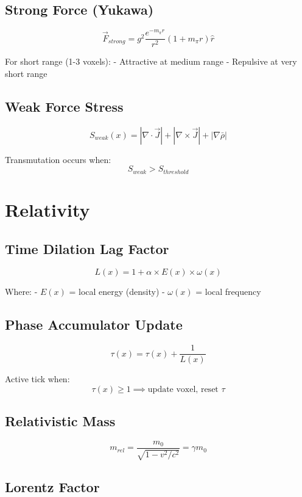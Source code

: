 \documentclass[
  11pt,
  letterpaper,
  twoside,
  openany]{book}
\makeatletter
\let\orig@section\section
\renewcommand{\section}{\needspace{8\baselineskip}\orig@section}
\let\orig@subsection\subsection
\renewcommand{\subsection}{\needspace{6\baselineskip}\orig@subsection}
\makeatother
\begin{document}
\subsection{Strong Force (Yukawa)}\label{strong-force-yukawa}

\[
\vec{F}_{strong} = g^2 \frac{e^{-m_\pi r}}{r^2}(1 + m_\pi r)\hat{r}
\]

For short range (1-3 voxels): - Attractive at medium range - Repulsive
at very short range

\subsection{Weak Force Stress}\label{weak-force-stress}

\[
S_{weak}(x) = |\nabla \cdot \vec{J}| + |\nabla \times \vec{J}| + |\nabla\bar{\rho}|
\]

Transmutation occurs when: \[
S_{weak} > S_{threshold}
\]

\section{Relativity}\label{relativity}

\subsection{Time Dilation Lag Factor}\label{time-dilation-lag-factor}

\[
L(x) = 1 + \alpha \times E(x) \times \omega(x)
\]

Where: - \(E(x)\) = local energy (density) - \(\omega(x)\) = local
frequency

\subsection{Phase Accumulator Update}\label{phase-accumulator-update}

\[
\tau(x) = \tau(x) + \frac{1}{L(x)}
\]

Active tick when: \[
\tau(x) \geq 1 \implies \text{update voxel, reset } \tau
\]

\subsection{Relativistic Mass}\label{relativistic-mass}

\[
m_{rel} = \frac{m_0}{\sqrt{1 - v^2/c^2}} = \gamma m_0
\]

\subsection{Lorentz Factor}\label{lorentz-factor}
\end{document}
